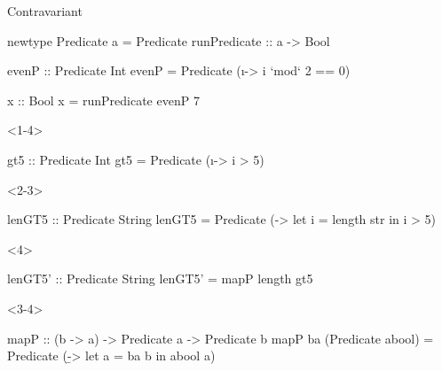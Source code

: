 \documentclass[UKenglish,usenames,dvipsnames,svgnames,table,aspectratio=169,mathserif]{beamer}
\newcommand{\nl}{\vspace{\baselineskip}}
\newcommand{\pnl}{\pause \nl}
\newcommand{\textslide}[1]{{
\begin{frame}
\begin{center}

#1

\end{center}
\end{frame}
}}
\begin{document}



\textslide{\Huge Contravariant}


\begin{frame}[fragile]
\begin{haskellcode}
newtype Predicate a =
  Predicate { runPredicate :: a -> Bool}
\end{haskellcode}

\pnl

\begin{haskellcode}
evenP :: Predicate Int
evenP = Predicate (\i -> i `mod` 2 == 0)
\end{haskellcode}

\pnl

\begin{haskellcode}
x :: Bool
x = runPredicate evenP 7
\end{haskellcode}

\end{frame}


\begin{frame}[fragile]
\begin{overlayarea}{\textwidth}{0.2\textheight}
\begin{onlyenv}<1-4>
\begin{haskellcode}
gt5 :: Predicate Int
gt5    = Predicate (\i ->
                      i > 5)
\end{haskellcode}
\end{onlyenv}
\end{overlayarea}

\begin{overlayarea}{\textwidth}{0.25\textheight}
\begin{onlyenv}<2-3>
\begin{haskellcode}
lenGT5 :: Predicate String
lenGT5 = Predicate (\str ->
                      let i = length str
                      in  i > 5)
\end{haskellcode}
\end{onlyenv}
\begin{onlyenv}<4>
\begin{haskellcode}
lenGT5' :: Predicate String
lenGT5' = mapP length gt5
\end{haskellcode}
\end{onlyenv}
\end{overlayarea}

\begin{overlayarea}{\textwidth}{0.25\textheight}
\begin{onlyenv}<3-4>
\begin{haskellcode}
mapP :: (b -> a) -> Predicate a -> Predicate b
mapP ba (Predicate abool) =
  Predicate (\b ->
               let a = ba b
               in  abool a)
\end{haskellcode}
\end{onlyenv}
\end{overlayarea}
\end{frame}
\end{document}
